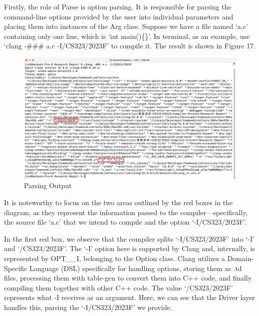 \documentclass[conference]{IEEEtran}
\begin{document}
Firstly, the role of Parse is option parsing. It is responsible for parsing the command-line options provided by the user into individual parameters and placing them into instances of the Arg class. Suppose we have a file named `a.c' containing only one line, which is `int main()\{\}'. In terminal, as an example, use `clang -\#\#\# a.c -I/CS323/2023F' to compile it. The result is shown in Figure 17.

\begin{figure}[htbp]
\centering
\includegraphics [width=1\linewidth]{pictures/DriverTerminal.png}
\caption{Parsing Output}
\label{fig17}
\end{figure}

It is noteworthy to focus on the two areas outlined by the red boxes in the diagram, as they represent the information passed to the compiler—specifically, the source file `a.c' that we intend to compile and the option `-I/CS323/2023F'.

In the first red box, we observe that the compiler splits `-I/CS323/2023F' into `-I' and `/CS323/2023F'. The `-I' option here is supported by Clang and, internally, is represented by OPT\_\_I, belonging to the Option class. Clang utilizes a Domain-Specific Language (DSL) specifically for handling options, storing them as .td files, processing them with table-gen to convert them into C++ code, and finally compiling them together with other C++ code. The value `/CS323/2023F' represents what -I receives as an argument. Here, we can see that the Driver layer handles this, parsing the `-I/CS323/2023F' we provide.
\end{document}
